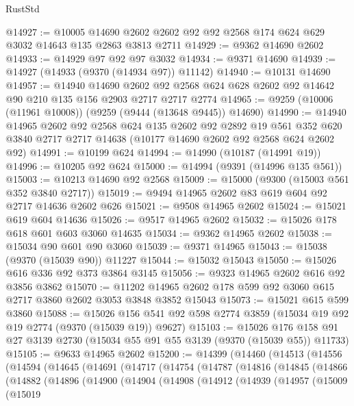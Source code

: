 \begin{lexlean}{RustStd}
\begin{coremodule}
@14927 := @10005 @14690 @2602 @2602 @92 @92 @2568 @174 @624 @629 @3032 @14643 @135 @2863 @3813 @2711
@14929 := @9362 @14690 @2602
@14933 := @14929 @97 @92 @97 @3032
@14934 := @9371 @14690
@14939 := @14927 (@14933 (@9370 (@14934 @97)) @11142)
@14940 := @10131 @14690
@14957 := @14940
    @14690
    @2602
    @92
    @2568
    @624
    @628
    @2602
    @92
    @14642
    @90
    @210
    @135
    @156
    @2903
    @2717
    @2717
    @2774
@14965 := @9259 (@10006 (@11961 @10008)) (@9259 (@9444 (@13648 @9445)) @14690)
@14990 := @14940
    @14965
    @2602
    @92
    @2568
    @624
    @135
    @2602
    @92
    @2892
    @19
    @561
    @352
    @620
    @3840
    @2717
    @2717
    @14638
    (@10177 @14690 @2602 @92 @2568 @624 @2602 @92)
@14991 := @10199 @624
@14994 := @14990 (@10187 (@14991 @19))
@14996 := @10205 @92 @624
@15000 := @14994 (@9391 (@14996 @135 @561))
@15003 := @10213 @14690 @92 @2568
@15009 := @15000 (@9300 (@15003 @561 @352 @3840 @2717))
@15019 := @9494 @14965 @2602 @83 @619 @604 @92 @2717 @14636 @2602 @626
@15021 := @9508 @14965 @2602
@15024 := @15021 @619 @604 @14636
@15026 := @9517 @14965 @2602
@15032 := @15026 @178 @618 @601 @603 @3060 @14635
@15034 := @9362 @14965 @2602
@15038 := @15034 @90 @601 @90 @3060
@15039 := @9371 @14965
@15043 := @15038 (@9370 (@15039 @90)) @11227
@15044 := @15032 @15043
@15050 := @15026 @616 @336 @92 @373 @3864 @3145
@15056 := @9323 @14965 @2602 @616 @92 @3856 @3862
@15070 := @11202 @14965 @2602 @178 @599 @92 @3060 @615 @2717 @3860 @2602 @3053 @3848 @3852 @15043
@15073 := @15021 @615 @599 @3860
@15088 := @15026
    @156
    @541
    @92
    @598
    @2774
    @3859
    (@15034 @19 @92 @19 @2774 (@9370 (@15039 @19)) @9627)
@15103 := @15026
    @176
    @158
    @91
    @27
    @3139
    @2730
    (@15034 @55 @91 @55 @3139 (@9370 (@15039 @55)) @11733)
@15105 := @9633 @14965 @2602
@15200 := @14399
    (@14460
      (@14513
        (@14556
          (@14594
            (@14645
              (@14691
                (@14717
                  (@14754
                    (@14787
                      (@14816
                        (@14845
                          (@14866
                            (@14882
                              (@14896
                                (@14900
                                  (@14904
                                    (@14908
                                      (@14912
                                        (@14939
                                          (@14957
                                            (@15009
                                              (@15019

\end{coremodule}
\end{lexlean}
